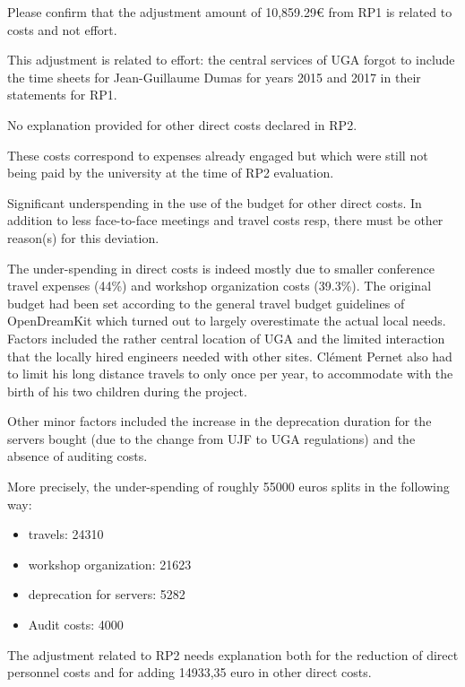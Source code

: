 \begin{EUcomment}
  Please confirm that the adjustment amount of 10,859.29€ from RP1 is
  related to costs and not effort.
\end{EUcomment}
This adjustment is related to effort: the central services of UGA
forgot to include the time sheets for Jean-Guillaume Dumas for years
2015 and 2017 in their statements for RP1.

\begin{EUcomment}
  No explanation provided for other direct costs declared in RP2.
\end{EUcomment}
These costs correspond to expenses already engaged but which were still not being paid by the university at
the time of RP2 evaluation.

\begin{EUcomment}
  Significant underspending in the use of the budget for other direct
  costs. In addition to less face-to-face meetings and travel costs
  resp, there must be other reason(s) for this deviation.
\end{EUcomment}

The under-spending in direct costs is indeed mostly due to smaller
conference travel expenses (44\%) and workshop organization costs
(39.3\%). The original budget had been set according to the general
travel budget guidelines of OpenDreamKit which turned out to largely
overestimate the actual local needs. Factors included the rather
central location of UGA and the limited interaction that the locally
hired engineers needed with other sites. Cl\'ement Pernet also had to
limit his long distance travels to only once per year, to accommodate
with the birth of his two children during the project.

Other minor factors included the increase in the deprecation duration for the
servers bought (due to the change from UJF to UGA regulations) and the absence of auditing costs.

More precisely, the under-spending of roughly 55000 euros splits in the following way:

\begin{itemize}
\item travels: 24310
\item workshop organization: 21623
\item deprecation for servers: 5282
\item Audit costs: 4000
\end{itemize}


\begin{EUcomment}
The adjustment related to RP2 needs explanation both for the reduction of direct personnel costs and for adding 14933,35 euro in other direct costs.
\end{EUcomment}

